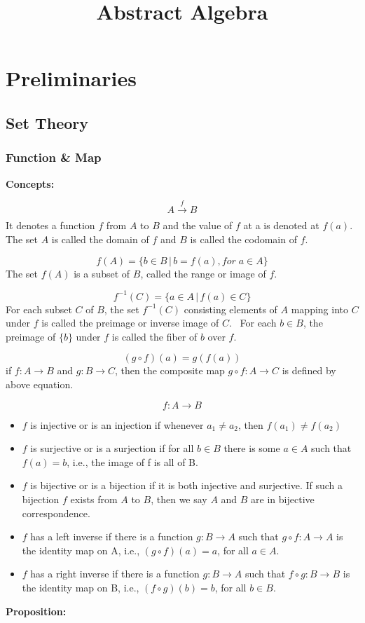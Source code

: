\documentclass{article}
\title{Abstract Algebra}
\author{}
\date{}
\begin{document}
\maketitle

\section{Preliminaries}
\subsection{Set Theory}
\subsubsection{Function \& Map}
\textbf{Concepts:} \par
$$ A \xrightarrow[]{f} B $$
It denotes a function $f$ from $A$ to $B$ and the value of $f$ at a is denoted at $f(a)$. 
The set $A$ is called the domain of $f$ and $B$ is called the codomain of $f$. \bigskip

$$ f(A) = \{b \in B \, | \, b = f(a), for \; a \in A\} $$
The set $f(A)$ is a subset of $B$, called the range or image of $f$. \bigskip

$$ f^{-1}(C) = \{ a \in A \, | \, f(a) \in C \} $$
For each subset $C$ of $B$, the set $f^{-1}(C)$ consisting elements of $A$ mapping into $C$ under $f$ is called the preimage
or inverse image of $C$. \
For each $ b \in B $, the preimage of $\{b\}$ under $f$ is called the fiber of $b$ over $f$. \bigskip

$$ (g \circ f)(a) = g(f(a)) $$
if $ f: A \rightarrow B $ and $ g: B \rightarrow C $, then the composite map $ g \circ f: A \rightarrow C $ is defined by above equation. \bigskip

$$ f: A \rightarrow B $$
\begin{itemize}
    \item $f$ is injective or is an injection if whenever $ a_{1} \ne a_{2} $, then $ f(a_{1}) \ne f(a_{2}) $
    \item $f$ is surjective or is a surjection if for all $ b \in B $ there is some $ a \in A $ 
          such that $ f(a) = b $, i.e., the image of f is all of B.
    \item $f$ is bijective or is a bijection if it is both injective and surjective. If such a bijection $f$
          exists from $A$ to $B$, then we say $A$ and $B$ are in bijective correspondence.
    \item $f$ has a left inverse if there is a function $ g: B \rightarrow A $ such that $ g \circ f: A \rightarrow A $ is the identity map on A,
          i.e., $ (g \circ f)(a) = a $, for all $ a \in A $.
    \item $f$ has a right inverse if there is a function $ g: B \rightarrow A $ such that $ f \circ g: B \rightarrow B $ is the identity map on B,
    i.e., $ (f \circ g)(b) = b $, for all $ b \in B $.
\end{itemize} \bigskip

\textbf{Proposition:} \par
\end{document}
